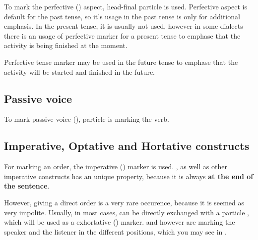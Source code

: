 To mark the perfective (\Pfv{}) aspect, head-final  particle is used.
Perfective aspect is default for the past tense, so it's usage in the past tense
is only for additional emphasis. In the present tense, it is usually not used,
however in some dialects there is an usage of perfective marker for a present
tense to emphase that the activity is being finished at the moment.

Perfective tense marker may be used in the future tense to emphase that the
activity will be started and finished in the future.





\subsection{Passive voice}

To mark passive voice (\Pass{}),  particle is marking the verb.


\subsection{Imperative, Optative and Hortative constructs}

For marking an order, the imperative (\Imp{}) marker  is used.
, as well as other imperative constructs has an unique property,
because it is always \textbf{at the end of the sentence}.


However, giving a direct order is a very rare occurence, because it is seemed as
very impolite. Usually, in most cases,  can be directly exchanged
with a particle , which will be used as a exhortative (\Exh{})
marker.  and  however are marking the speaker and the
listener in the different positions, which you may see in
.

